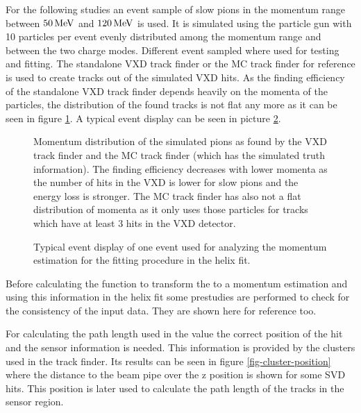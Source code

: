 For the following studies an event sample of slow pions in the momentum range between $\unit[50]{MeV}$ and $\unit[120]{MeV}$ is used. It is simulated using the particle gun with 10 particles per event evenly distributed among the momentum range and between the two charge modes. Different event sampled where used for testing and fitting. The standalone VXD track finder or the MC track finder for reference is used to create tracks out of the simulated VXD hits. As the finding efficiency of the standalone VXD track finder depends heavily on the momenta of the particles, the distribution of the found tracks is not flat any more as it can be seen in figure \ref{fig-vxd-finding-efficiency}. A typical event display can be seen in picture \ref{fig-vxd-event-display}.

\begin{figure}
 \centering
 \caption{Momentum distribution of the simulated pions as found by the VXD track finder and the MC track finder (which has the simulated truth information). The finding efficiency decreases with lower momenta as the number of hits in the VXD is lower for slow pions and the energy loss is stronger. The MC track finder has also not a flat distribution of momenta as it only uses those particles for tracks which have at least 3 hits in the VXD detector.}
 \label{fig-vxd-finding-efficiency}
\end{figure}

\begin{figure}
 \centering
 \caption{Typical event display of one event used for analyzing the momentum estimation for the fitting procedure in the helix fit.}
 \label{fig-vxd-event-display}
\end{figure}

Before calculating the function to transform the \dedx to a momentum estimation and using this information in the helix fit some prestudies are performed to check for the consistency of the input data. They are shown here for reference too.

For calculating the path length used in the \dedx value the correct position of the hit and the sensor information is needed. This information is provided by the clusters used in the track finder. Its results can be seen in figure \ref{fig-cluster-position} where the distance to the beam pipe over the z position is shown for some SVD hits. This position is later used to calculate the path length of the tracks in the sensor region.

